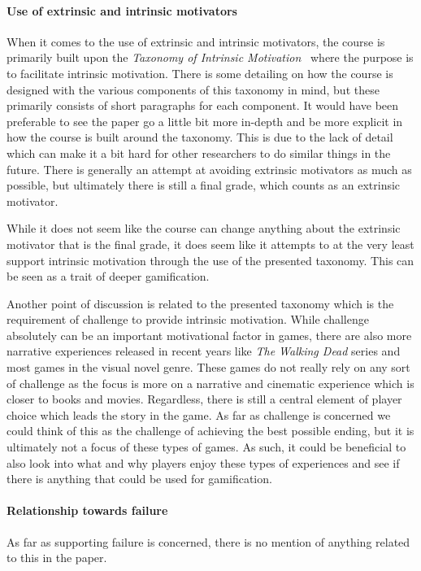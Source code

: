 \paragraph{Use of extrinsic and intrinsic motivators}
When it comes to the use of extrinsic and intrinsic motivators, the course is primarily built upon the \emph{Taxonomy of Intrinsic Motivation}~\cite{maloneTax} where the purpose is to facilitate intrinsic motivation. There is some detailing on how the course is designed with the various components of this taxonomy in mind, but these primarily consists of short paragraphs for each component. It would have been preferable to see the paper go a little bit more in-depth and be more explicit in how the course is built around the taxonomy. This is due to the lack of detail which can make it a bit hard for other researchers to do similar things in the future. 
There is generally an attempt at avoiding extrinsic motivators as much as possible, but ultimately there is still a final grade, which counts as an extrinsic motivator. 

While it does not seem like the course can change anything about the extrinsic motivator that is the final grade, it does seem like it attempts to at the very least support intrinsic motivation through the use of the presented taxonomy. This can be seen as a trait of deeper gamification. 

Another point of discussion is related to the presented taxonomy which is the requirement of challenge to provide intrinsic motivation. While challenge absolutely can be an important motivational factor in games, there are also more narrative experiences released in recent years like \emph{The Walking Dead} series and most games in the visual novel genre. These games do not really rely on any sort of challenge as the focus is more on a narrative and cinematic experience which is closer to books and movies. Regardless, there is still a central element of player choice which leads the story in the game. As far as challenge is concerned we could think of this as the challenge of achieving the best possible ending, but it is ultimately not a focus of these types of games. As such, it could be beneficial to also look into what and why players enjoy these types of experiences and see if there is anything that could be used for gamification.

\paragraph{Relationship towards failure}
As far as supporting failure is concerned, there is no mention of anything related to this in the paper. 


